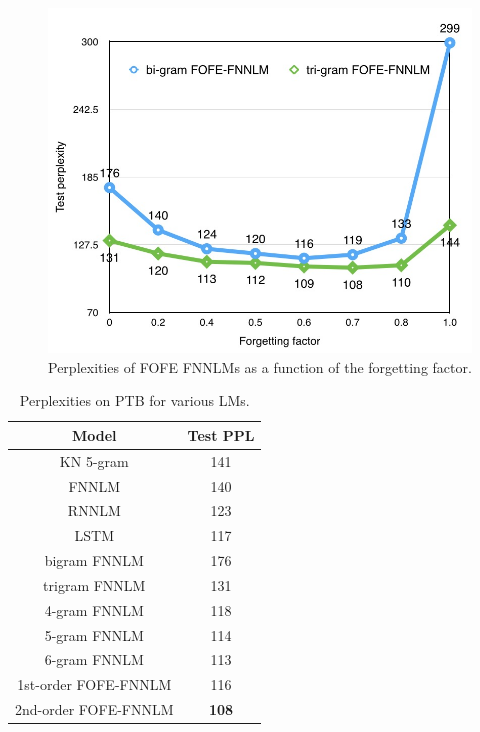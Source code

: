 \documentclass[11pt]{article}
\begin{document}
\begin{figure}[t]
	\centering
	\includegraphics[width=0.85\linewidth]{Dif_factor}
	\caption{Perplexities of FOFE FNNLMs as a function of the forgetting factor.}
	\label{fig:Dif_factor}
\end{figure}

\begin{table}[t]
	\centering
	\caption{Perplexities on PTB for various LMs.}
	\begin{tabular}{|c|c|}
		\hline 
		Model  & Test PPL \\\hline \hline
		KN 5-gram \cite{Mikolov2011Extension}      &  141 \\
		FNNLM \cite{Mikolov2012}  & 140 \\
		RNNLM \cite{Mikolov2011Extension}  & 123 \\
		LSTM \cite{Graves2013}   &  117   \\ \hline
		bigram FNNLM & 176 \\
		trigram FNNLM & 131 \\
		4-gram FNNLM & 118 \\
		5-gram FNNLM & 114 \\
		6-gram FNNLM & 113 \\ \hline
		1st-order FOFE-FNNLM & 116 \\
		2nd-order FOFE-FNNLM & \textbf{108} \\ \hline
	\end{tabular} 
	\label{tab:PTB_summary}
\end{table}
\end{document}
